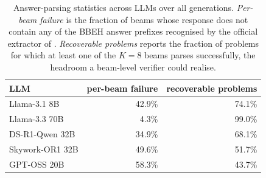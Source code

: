 \begin{table}[!htbp]
  \caption{Answer-parsing statistics across LLMs over all generations. \emph{Per-beam failure} is the fraction of beams whose response does not contain any of the BBEH answer prefixes recognised by the official extractor of \citet{kazemi2025bigbenchextrahard}. \emph{Recoverable problems} reports the fraction of problems for which at least one of the $K=8$ beams parses successfully, the headroom a beam-level verifier could realise.}
  \label{tab:extraction-failure}
  \centering
  \footnotesize
  \begin{tabular}{@{}l r r@{}}
    \toprule
    \textbf{LLM} & per-beam failure & recoverable problems \\
    \midrule
    Llama-3.1 8B       &  42.9\% &  74.1\% \\
    Llama-3.3 70B      &   4.3\% &  99.0\% \\
    DS-R1-Qwen 32B     &  34.9\% &  68.1\% \\
    Skywork-OR1 32B    &  49.6\% &  51.7\% \\
    GPT-OSS 20B        &  58.3\% &  43.7\% \\
    \bottomrule
  \end{tabular}
\end{table}
